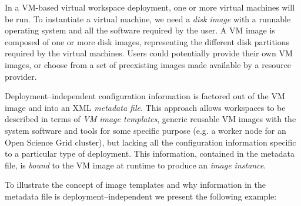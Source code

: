 In a VM-based virtual workspace deployment, one or more virtual machines will be run. To instantiate a virtual machine, we need a \emph{disk image} with a runnable operating system and all the software required by the user. A VM image is composed of one or more disk images, representing the different disk partitions required by the virtual machines. Users could potentially provide their own VM images, or choose from a set of preexisting images made available by a resource provider.

Deployment--independent configuration information is factored out of the VM image and into an XML \emph{metadata file}. This approach allows workspaces to be described in terms of \emph{VM image templates}, generic reusable VM images with the system software and tools for some specific purpose (e.g. a worker node for an Open Science Grid cluster), but lacking all the configuration information specific to a particular type of deployment. This information, contained in the metadata file, is \emph{bound} to the VM image at runtime to produce an \emph{image instance}.

To illustrate the concept of image templates and why information in the metadata file is deployment--independent we present the following example:

